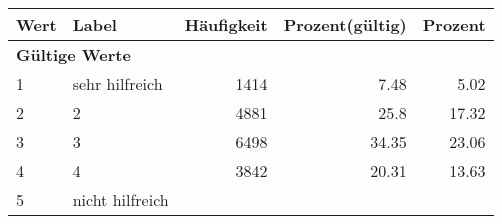      \begin{longtable}{lXrrr}
     \toprule
     \textbf{Wert} & \textbf{Label} & \textbf{Häufigkeit} & \textbf{Prozent(gültig)} & \textbf{Prozent} \\
     \endhead
     \midrule
     \multicolumn{5}{l}{\textbf{Gültige Werte}}\\

     1 &
     \multicolumn{1}{X}{ sehr hilfreich   } &


       \num{1414} &
       \num[round-mode=places,round-precision=2]{7,48} &
         \num[round-mode=places,round-precision=2]{5,02} \\

     2 &
     \multicolumn{1}{X}{ 2   } &


       \num{4881} &
       \num[round-mode=places,round-precision=2]{25,8} &
         \num[round-mode=places,round-precision=2]{17,32} \\

     3 &
     \multicolumn{1}{X}{ 3   } &


       \num{6498} &
       \num[round-mode=places,round-precision=2]{34,35} &
         \num[round-mode=places,round-precision=2]{23,06} \\

     4 &
     \multicolumn{1}{X}{ 4   } &


       \num{3842} &
       \num[round-mode=places,round-precision=2]{20,31} &
         \num[round-mode=places,round-precision=2]{13,63} \\

     5 &
     \multicolumn{1}{X}{ nicht hilfreich   } &



\end{longtable}
